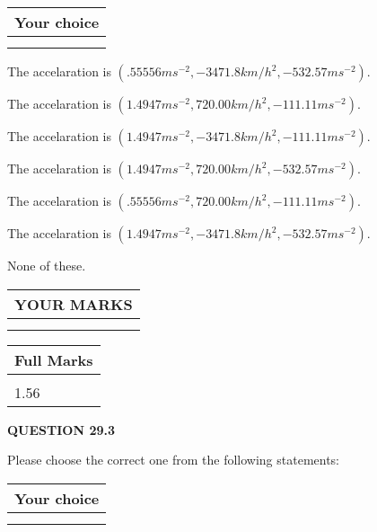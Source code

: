 \documentclass[12pt]{article}
\begin{document}
  
  
\noindent\hspace{3.0in} \begin{tabular}{|l|}
\hline
Your choice \\
\hline
 \\ 
 \\ 
\hline
\end{tabular}
  
  
 
 
The accelaration is
$(
.55556ms^{-2},
-3471.8km/h^2,
-532.57ms^{-2}
).
$
 
 
The accelaration is
$(
1.4947ms^{-2},
720.00km/h^2,
-111.11ms^{-2}
).
$
 
 
The accelaration is
$(
1.4947ms^{-2},
-3471.8km/h^2,
-111.11ms^{-2}
).
$
 
 
The accelaration is
$(
1.4947ms^{-2},
720.00km/h^2,
-532.57ms^{-2}
).
$
 
 
The accelaration is
$(
.55556ms^{-2},
720.00km/h^2,
-111.11ms^{-2}
).
$
 
 
The accelaration is
$(
1.4947ms^{-2},
-3471.8km/h^2,
-532.57ms^{-2}
).
$
 
 
 None of these.
 
 
 
 

 
\vspace{0.3in}
  
\vspace{0.2in}
  
\noindent\begin{tabular}{|l|}
\hline
 YOUR MARKS  \\
\hline
 \\ 
 \\ 
\hline
\end{tabular}
\hspace{0.05in} \begin{tabular}{|l|}
\hline
 Full Marks  \\
\hline
 \\ 
1.56 \\
\hline
\end{tabular}
{\textbf{\Large{QUESTION
29.3 
}}}
  
  
Please choose the correct one from the following statements:
  
  
\noindent\hspace{3.0in} \begin{tabular}{|l|}
\hline
Your choice \\
\hline
 \\ 
 \\ 
\hline
\end{tabular}
  
\end{document}
